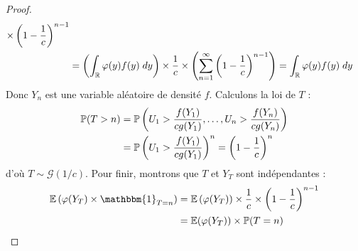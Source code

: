 \begin{proof}
\begin{align*}
                \times \left( 1 - \frac{1}{c} \right)^{n-1} \\ 
                &= \left(\int_{\mathbb{R}} \varphi(y) f(y) \; dy\right) \times \frac{1}{c} \times \left( \sum_{n=1}^{\infty} \left(1 - \frac{1}{c} \right)^{n-1}\right)  
                = \int_{\mathbb{R}} \varphi(y) f(y) \; dy 
        \end{align*}
    Donc $Y_n$ est une variable aléatoire de densité $f$. Calculons la loi de $T$ : 
        \begin{align*}
            \mathbb{P}(T > n) &= \mathbb{P} \left( U_1 > \frac{f(Y_1)}{cg(Y_1)}, \dots, U_n > \frac{f(Y_n)}{cg(Y_n)}  \right) \\ 
            &= \mathbb{P} \left(U_1 > \frac{f(Y_1)}{cg(Y_1)} \right)^n = \left(1 - \frac{1}{c} \right)^n  
        \end{align*}
    d'où $T \sim \mathcal{G}(1/c)$. Pour finir, montrons que $T$ et $Y_T$ sont indépendantes : 
        \begin{align*}
            \mathbb{E} \left( \varphi(Y_T) \times \mathbbm{1}_{T=n}  \right) &= \mathbb{E} \left( \varphi(Y_T)\right) \times \frac{1}{c} \times \left(1 - \frac{1}{c} \right)^{n-1} \\ 
            &= \mathbb{E}( \varphi(Y_T)) \times \myP(T = n)   
        \end{align*}
\end{proof}

